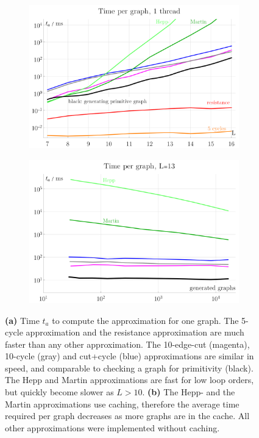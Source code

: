 \documentclass[11pt]{scrartcl}
\numberwithin{equation}{section}
\begin{document}
\begin{figure}[htb]
	
	\begin{subfigure}{ .49 \linewidth}
		\centering
		\includegraphics[width=\linewidth]{figures/ta}
		\subcaption{}
		\label{fig:ta}
	\end{subfigure}
	\begin{subfigure}{ .49 \linewidth}
		\centering
		\includegraphics[width=\linewidth]{figures/ta_generated}
		\subcaption{}
		\label{fig:ta_generated}
	\end{subfigure}
	\caption{ 
		\textbf{(a)} Time $t_a$ to compute the approximation for one graph. The 5-cycle approximation and the resistance approximation are much faster than any other approximation. The 10-edge-cut (magenta), 10-cycle (gray) and cut+cycle (blue) approximations are similar in speed, and comparable to checking a graph for primitivity (black). The Hepp and Martin approximations are fast for low loop orders, but quickly become slower as $L>10$.   
		\textbf{(b)} The Hepp- and the Martin approximations use caching, therefore the average time required per graph decreases as more graphs are in the cache. All other approximations were implemented without caching.}
	
\end{figure}
\end{document}
